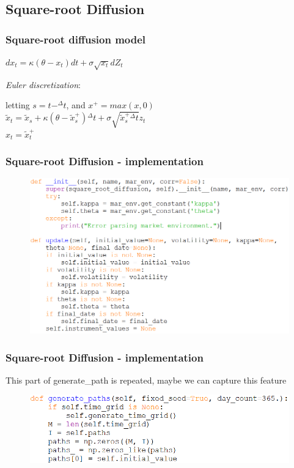 \documentclass{beamer}
\begin{document}
\subsection{Square-root Diffusion}
\begin{frame}
\frametitle{Square-root diffusion model}
\begin{center}
	$dx_{t} = \kappa(\theta-x_{t})dt + \sigma\sqrt{x_{t}}dZ_{t}$
\end{center}
\emph{Euler discretization}:
\begin{center}
	letting $s = t-^{\Delta}t$, and $x^{+} = max(x,0)$\\[3mm]
	$\tilde{x}_{t} = \tilde{x}_{s} + \kappa(\theta-\tilde{x}_{s}^{+}){^{\Delta}t} + \sigma\sqrt{\tilde{x}_{s}^{+}{^{\Delta}t}}z_{t}$\\[3mm]
	$x_{t} = \tilde{x}_{t}^{+}$
\end{center}
\end{frame}

\begin{frame}
\frametitle{Square-root Diffusion - implementation}
\begin{figure}[H]
	\includegraphics[scale=0.42]{srd_init_update.png}
\end{figure}
\end{frame}

\begin{frame}
\frametitle{Square-root Diffusion - implementation}
This part of generate\_path is repeated, maybe we can capture this feature
\begin{figure}[H]
	\includegraphics[scale=0.4]{srd_generate_path_1.png}
\end{figure}
\end{frame}
\end{document}
